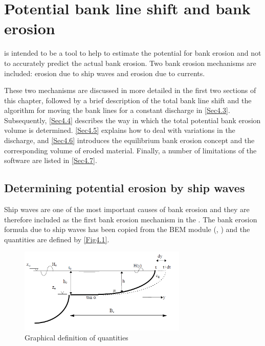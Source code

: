 \chapter{Potential bank line shift and bank erosion} \label{Chp4}

\dfastbe is intended to be a tool to help to estimate the potential for bank erosion and not to accurately predict the actual bank erosion.
Two bank erosion mechanisms are included: erosion due to ship waves and erosion due to currents.

These two mechanisms are discussed in more detailed in the first two sections of this chapter, followed by a brief description of the total bank line shift and the algorithm for moving the bank lines for a constant discharge in \autoref{Sec4.3}.
Subsequently, \autoref{Sec4.4} describes the way in which the total potential bank erosion volume is determined.
\autoref{Sec4.5} explains how to deal with variations in the discharge, and \autoref{Sec4.6} introduces the equilibrium bank erosion concept and the corresponding volume of eroded material.
Finally, a number of limitations of the software are listed in \autoref{Sec4.7}.

\section{Determining potential erosion by ship waves} \label{Sec4.1}

Ship waves are one of the most important causes of bank erosion \citep{Verheij00} and they are therefore included as the first bank erosion mechanism in the \dfastbe.
The bank erosion formula due to ship waves has been copied from the BEM module (\citet{Verheij00}, \citet{StolkerV01b}) and the quantities are defined by \autoref{Fig4.1}.

\begin{figure}
\center
\includegraphics[width=8cm]{figures/Fig4-1.png}
\caption{Graphical definition of quantities}
\label{Fig4.1}
\end{figure}

